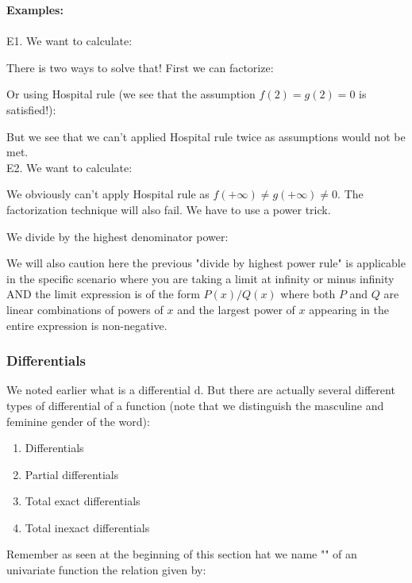 	\begin{tcolorbox}[colframe=black,colback=white,sharp corners]
	\textbf{{\Large {}}Examples:}\\\\
	E1. We want to calculate:
	
	There is two ways to solve that! First we can factorize:
	
	Or using Hospital rule (we see that the assumption $f(2)=g(2)=0$ is satisfied!):
	
	But we see that we can't applied Hospital rule twice as assumptions would not be met.\\
	
	E2. We want to calculate:
	
	We obviously can't apply Hospital rule as $f(+\infty)\neq g(+\infty) \neq 0$. The factorization technique will also fail. We have to use a power trick.
	\end{tcolorbox}
	
	\begin{tcolorbox}[colframe=black,colback=white,sharp corners]
	We divide by the highest denominator power: 
	
	\end{tcolorbox}
	We will also caution here the previous "divide by highest power rule" is applicable in the specific scenario where you are taking a limit at infinity or minus infinity AND the limit expression is of the form $P(x)/Q(x)$ where both $P$ and $Q$ are linear combinations of powers of $x$ and the largest power of $x$ appearing in the entire expression is non-negative.
	
	\subsubsection{Differentials}
	
	We noted earlier what is a differential $\mathrm{d}$. But there are actually several different types of differential of a function (note that we distinguish the masculine and feminine gender of the word):
	\begin{enumerate}
		\item Differentials
		\item Partial differentials
		\item Total exact differentials
		\item Total inexact differentials
	\end{enumerate}
		Remember as seen at the beginning of this section hat we name  "\label{differential}" of an univariate function the relation given by:
	
